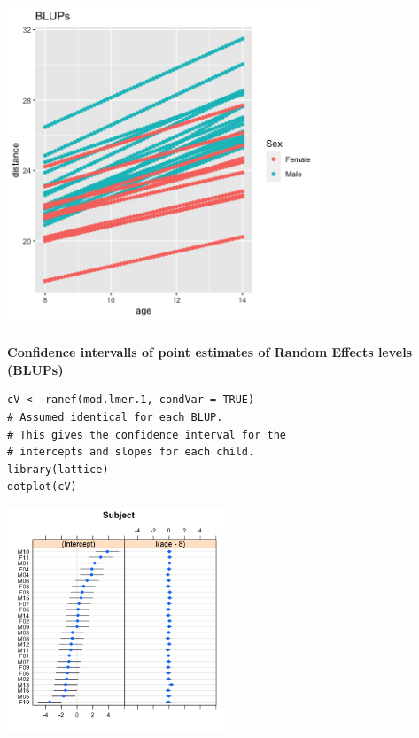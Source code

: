\documentclass{beamer}
\begin{document}
\begin{frame}[fragile]
    \frametitle{}
    \begin{center}
        \includegraphics[width=0.7\textwidth]{lectures/day_6_praxis_and_fitting_of_mems/figures/unnamed-chunk-32-1.png}
    \end{center}
\end{frame}

\begin{frame}[fragile]
    \frametitle{}
    \textbf{Confidence intervalls of point estimates of Random Effects levels (BLUPs)}

    \small\begin{Verbatim}[frame=single]
cV <- ranef(mod.lmer.1, condVar = TRUE) 
# Assumed identical for each BLUP.
# This gives the confidence interval for the 
# intercepts and slopes for each child.  
library(lattice)
dotplot(cV) 
    \end{Verbatim}
    \begin{center}
        \includegraphics[width=0.5\textwidth]{lectures/day_6_praxis_and_fitting_of_mems/figures/unnamed-chunk-33-1.png}
    \end{center}
\end{frame}
\end{document}
